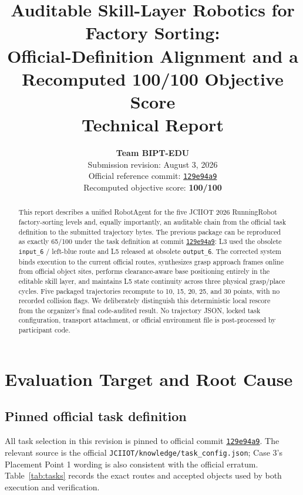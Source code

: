\documentclass[11pt,a4paper]{article}
\newcommand{\commit}{\href{https://github.com/JCIIOT2026/JCIIOT2026/tree/129e94a9cff787031472045e19c24a4baeaefc48}{\texttt{129e94a9}}}
\begin{document}
\title{\textbf{Auditable Skill-Layer Robotics for Factory Sorting:\\
Official-Definition Alignment and a Recomputed 100/100 Objective Score}\\[0.8em]
\large Technical Report}
\author{\textbf{Team BIPT-EDU}\\
\small Submission revision: August 3, 2026\\
\small Official reference commit: \commit\\
\small Recomputed objective score: \textbf{100/100}}
\date{}
\maketitle

\begin{abstract}
This report describes a unified RobotAgent for the five JCIIOT 2026 RunningRobot factory-sorting levels and, equally importantly, an auditable chain from the official task definition to the submitted trajectory bytes. The previous package can be reproduced as exactly 65/100 under the task definition at commit \commit: L3 used the obsolete \texttt{input\_6} / left-blue route and L5 released at obsolete \texttt{output\_6}. The corrected system binds execution to the current official routes, synthesizes grasp approach frames online from official object sites, performs clearance-aware base positioning entirely in the editable skill layer, and maintains L5 state continuity across three physical grasp/place cycles. Five packaged trajectories recompute to 10, 15, 20, 25, and 30 points, with no recorded collision flags. We deliberately distinguish this deterministic local rescore from the organizer's final code-audited result. No trajectory JSON, locked task configuration, transport attachment, or official environment file is post-processed by participant code.
\end{abstract}

\tableofcontents

\section{Evaluation Target and Root Cause}

\subsection{Pinned official task definition}

All task selection in this revision is pinned to official commit \commit. The relevant source is the official \texttt{JCIIOT/knowledge/task\_config.json}; Case 3's Placement Point 1 wording is also consistent with the official erratum. Table~\ref{tab:tasks} records the exact routes and accepted objects used by both execution and verification.
\end{document}
